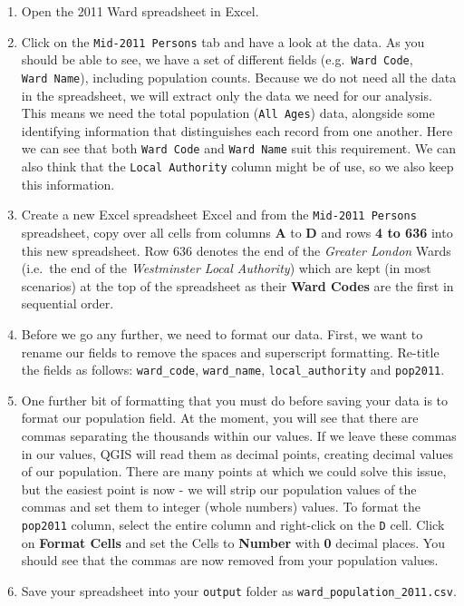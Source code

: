 \documentclass[
]{book}
\providecommand{\tightlist}{%
  \setlength{\itemsep}{0pt}\setlength{\parskip}{0pt}}
\begin{document}
\begin{enumerate}
\def\labelenumi{\arabic{enumi}.}
\tightlist
\item
  Open the 2011 Ward spreadsheet in Excel.
\item
  Click on the \texttt{Mid-2011\ Persons} tab and have a look at the data. As you should be able to see, we have a set of different fields (e.g.~\texttt{Ward\ Code}, \texttt{Ward\ Name}), including population counts. Because we do not need all the data in the spreadsheet, we will extract only the data we need for our analysis. This means we need the total population (\texttt{All\ Ages}) data, alongside some identifying information that distinguishes each record from one another. Here we can see that both \texttt{Ward\ Code} and \texttt{Ward\ Name} suit this requirement. We can also think that the \texttt{Local\ Authority} column might be of use, so we also keep this information.
\item
  Create a new Excel spreadsheet Excel and from the \texttt{Mid-2011\ Persons} spreadsheet, copy over all cells from columns \textbf{A} to \textbf{D} and rows \textbf{4 to 636} into this new spreadsheet. Row 636 denotes the end of the \emph{Greater London} Wards (i.e.~the end of the \emph{Westminster Local Authority}) which are kept (in most scenarios) at the top of the spreadsheet as their \textbf{Ward Codes} are the first in sequential order.
\item
  Before we go any further, we need to format our data. First, we want to rename our fields to remove the spaces and superscript formatting. Re-title the fields as follows: \texttt{ward\_code}, \texttt{ward\_name}, \texttt{local\_authority} and \texttt{pop2011}.
\item
  One further bit of formatting that you must do before saving your data is to format our population field. At the moment, you will see that there are commas separating the thousands within our values. If we leave these commas in our values, QGIS will read them as decimal points, creating decimal values of our population. There are many points at which we could solve this issue, but the easiest point is now - we will strip our population values of the commas and set them to integer (whole numbers) values. To format the \texttt{pop2011} column, select the entire column and right-click on the \texttt{D} cell. Click on \textbf{Format Cells} and set the Cells to \textbf{Number} with \textbf{0} decimal places. You should see that the commas are now removed from your population values.
\item
  Save your spreadsheet into your \texttt{output} folder as \texttt{ward\_population\_2011.csv}.
\end{enumerate}
\end{document}
